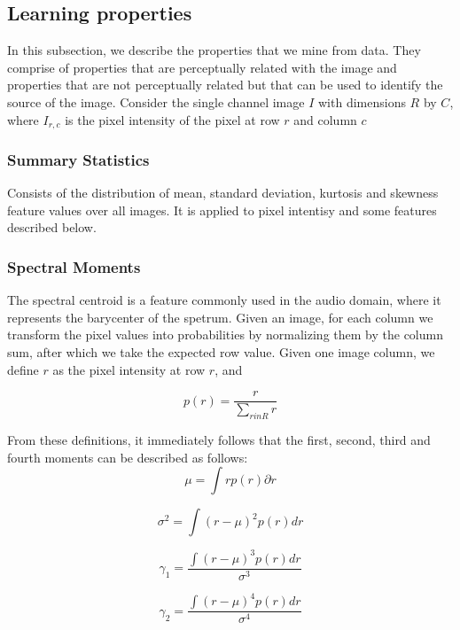 \subsection{Learning properties}
In this subsection, we describe the properties that we mine from data. They
comprise of properties that are perceptually related with the image and
properties that are not perceptually related but that can be used to identify
the source of the image. Consider the single channel image $I$ with dimensions 
$R$ by $C$, where $I_{r, c}$ is the pixel intensity of the pixel at row $r$ and column $c$

\subsubsection{Summary Statistics}
Consists of the distribution of mean, standard
deviation, kurtosis and skewness feature values over all images. It is applied
to pixel intentisy and some features described below.

\subsubsection{Spectral Moments}
The spectral centroid is a feature commonly used in the audio domain, where it
represents the barycenter of the spetrum. Given an image, for each column we transform the
pixel values into probabilities by normalizing them by the column sum, after which we
take the expected row value. Given one image column, we define $r$ as the pixel
intensity at row $r$, and 

\begin{equation}
    p(r) = \frac{r}{\sum_{r in R}r}
\end{equation}

From these definitions, it immediately follows that the first, second, third and fourth moments
can be described as follows: 
\begin{equation}
    \mu = \int rp(r) \partial r
\end{equation}

\begin{equation}
    \sigma^2 = \int (r - \mu)^2 p(r) dr
\end{equation}

\begin{equation}
    \gamma_1 = \frac{\int (r - \mu)^3 p(r) dr}{\sigma^3}
\end{equation}

\begin{equation}
    \gamma_2 = \frac{\int (r - \mu)^4 p(r) dr}{\sigma^4}
\end{equation}
